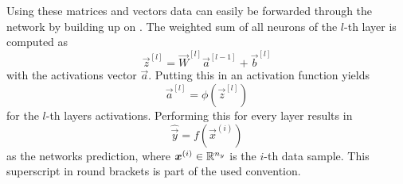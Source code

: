 Using these matrices and vectors data can easily be forwarded through the network by building up on .
The weighted sum of all neurons of the $l$-th layer is computed as
\begin{equation}
	\label{eq:weighted-sum}
	\vec{z}^{[l]} = \vec{W}^{[l]} \vec{a}^{[l-1]} + \vec{b}^{[l]}
\end{equation}
with the activations vector $\vec{a}$.
Putting this in an activation function yields
\begin{equation}
	\label{eq:activations}
	\vec{a}^{[l]} = \phi\left(\vec{z}^{[l]}\right)
\end{equation}
for the $l$-th layers activations.
Performing this for every layer results in 
\begin{equation}
	\label{eq:feedforward}
	\hat{\vec{y}} = f(\vec{x}^{(i)})
\end{equation}
as the networks prediction, where $\vec{x^}{(i)} \in \mathbb{R}^{n_y}$ is the $i$-th data sample.
This superscript in round brackets is part of the used convention.

